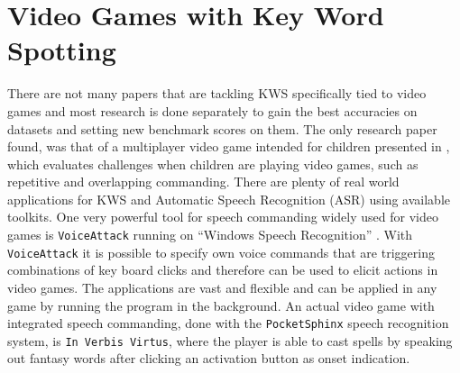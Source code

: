 
\section{Video Games with Key Word Spotting}\label{sec:prev_kws_games}
\thesisStateRevised
There are not many papers that are tackling KWS specifically tied to video games and most research is done separately to gain the best accuracies on datasets and setting new benchmark scores on them.
The only research paper found, was that of a multiplayer video game intended for children presented in \cite{Harshavardhan2015}, which evaluates challenges when children are playing video games, such as repetitive and overlapping commanding.
There are plenty of real world applications for KWS and Automatic Speech Recognition (ASR) using available toolkits.
One very powerful tool for speech commanding widely used for video games is \texttt{VoiceAttack} running on \enquote{Windows Speech Recognition} \cite{Xiong2017}.
With \texttt{VoiceAttack} it is possible to specify own voice commands that are triggering combinations of key board clicks and therefore can be used to elicit actions in video games.
The applications are vast and flexible and can be applied in any game by running the program in the background.
An actual video game with integrated speech commanding, done with the \texttt{PocketSphinx} \cite{Huggins2006} speech recognition system, is \texttt{In Verbis Virtus}, where the player is able to cast spells by speaking out fantasy words after clicking an activation button as onset indication.
